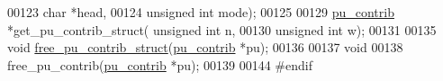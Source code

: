 \begin{DoxyCode}
00123             \textcolor{keywordtype}{char} *head,
00124             \textcolor{keywordtype}{unsigned} \textcolor{keywordtype}{int} mode);
00125 
00129 \hyperlink{group__data__structures_structpu__contrib}{pu\_contrib}  *get\_pu\_contrib\_struct( \textcolor{keywordtype}{unsigned} \textcolor{keywordtype}{int} n,
00130                                     \textcolor{keywordtype}{unsigned} \textcolor{keywordtype}{int} w);
00131 
00135 \textcolor{keywordtype}{void}        \hyperlink{group__up__cofold_gac20bd61824981d45ce0dc9934aa56df8}{free\_pu\_contrib\_struct}(\hyperlink{group__data__structures_structpu__contrib}{pu\_contrib} *pu);
00136 
00137 \textcolor{keywordtype}{void}
00138 free\_pu\_contrib(\hyperlink{group__data__structures_structpu__contrib}{pu\_contrib} *pu);
00139 
00144 \textcolor{preprocessor}{#endif}
\end{DoxyCode}
